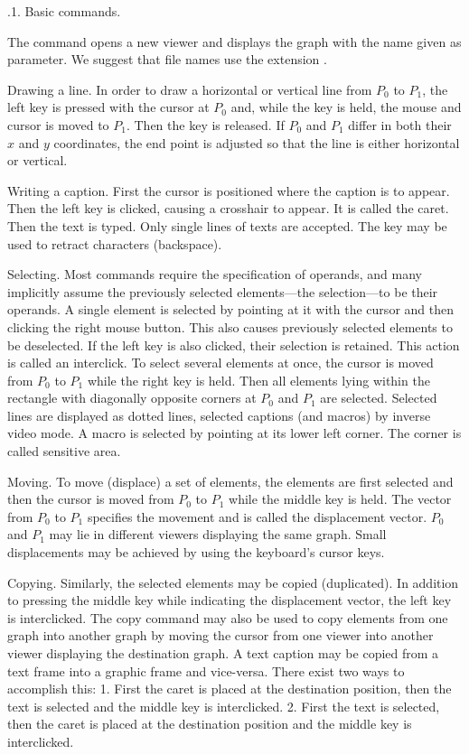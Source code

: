 .1. Basic commands.

The command  opens a new viewer and displays the graph with the name given as parameter. We suggest that file names use the extension .

Drawing a line. In order to draw a horizontal or vertical line from $P_0$ to $P_1$, the left key is pressed with the cursor at $P_0$ and, while the key is held, the mouse and cursor is moved to $P_1$. Then the key is released. If $P_0$ and $P_1$ differ in both their $x$ and $y$ coordinates, the end point is adjusted so that the line is either horizontal or vertical.

Writing a caption. First the cursor is positioned where the caption is to appear. Then the left key is clicked, causing a crosshair to appear. It is called the caret. Then the text is typed. Only single lines of texts are accepted. The  key may be used to retract characters (backspace).

Selecting. Most commands require the specification of operands, and many implicitly assume the previously selected elements---the selection---to be their operands. A single element is selected by pointing at it with the cursor and then clicking the right mouse button. This also causes previously selected elements to be deselected. If the left key is also clicked, their selection is retained. This action is called an interclick. To select several elements at once, the cursor is moved from $P_0$ to $P_1$ while the right key is held. Then all elements lying within the rectangle with diagonally opposite corners at $P_0$ and $P_1$ are selected. Selected lines are displayed as dotted lines, selected captions (and macros) by inverse video mode. A macro is selected by pointing at its lower left corner. The corner is called sensitive area.

Moving. To move (displace) a set of elements, the elements are first selected and then the cursor is moved from $P_0$ to $P_1$ while the middle key is held. The vector from $P_0$ to $P_1$ specifies the movement and is called the displacement vector. $P_0$ and $P_1$ may lie in different viewers displaying the same graph. Small displacements may be achieved by using the keyboard's cursor keys.

Copying. Similarly, the selected elements may be copied (duplicated). In addition to pressing the middle key while indicating the displacement vector, the left key is interclicked. The copy command may also be used to copy elements from one graph into another graph by moving the cursor from one viewer into another viewer displaying the destination graph. A text caption may be copied from a text frame into a graphic frame and vice-versa. There exist two ways to accomplish this: 1. First the caret is placed at the destination position, then the text is selected and the middle key is interclicked. 2. First the text is selected, then the caret is placed at the destination position and the middle key is interclicked.

